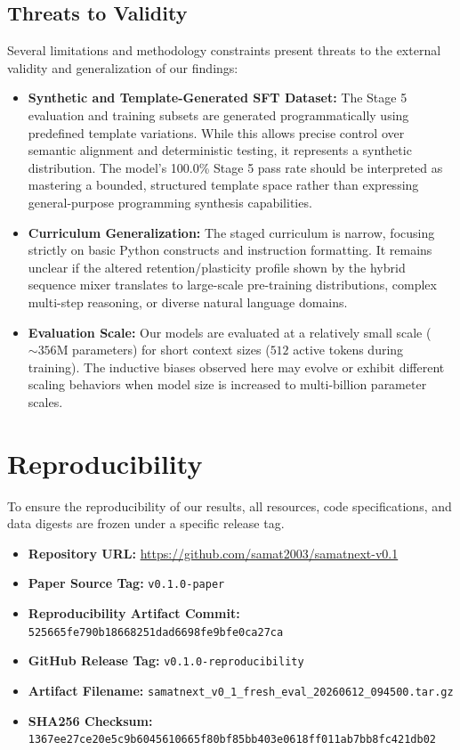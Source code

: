 \documentclass[11pt,a4paper]{article}
\begin{document}
\subsection{Threats to Validity}
Several limitations and methodology constraints present threats to the external validity and generalization of our findings:
\begin{itemize}
    \item \textbf{Synthetic and Template-Generated SFT Dataset:} The Stage 5 evaluation and training subsets are generated programmatically using predefined template variations. While this allows precise control over semantic alignment and deterministic testing, it represents a synthetic distribution. The model's 100.0\% Stage 5 pass rate should be interpreted as mastering a bounded, structured template space rather than expressing general-purpose programming synthesis capabilities.
    \item \textbf{Curriculum Generalization:} The staged curriculum is narrow, focusing strictly on basic Python constructs and instruction formatting. It remains unclear if the altered retention/plasticity profile shown by the hybrid sequence mixer translates to large-scale pre-training distributions, complex multi-step reasoning, or diverse natural language domains.
    \item \textbf{Evaluation Scale:} Our models are evaluated at a relatively small scale ($\sim 356$M parameters) for short context sizes ($512$ active tokens during training). The inductive biases observed here may evolve or exhibit different scaling behaviors when model size is increased to multi-billion parameter scales.
\end{itemize}

\section{Reproducibility}
To ensure the reproducibility of our results, all resources, code specifications, and data digests are frozen under a specific release tag.
\begin{itemize}
    \item \textbf{Repository URL:} \url{https://github.com/samat2003/samatnext-v0.1}
    \item \textbf{Paper Source Tag:} \texttt{v0.1.0-paper}
    \item \textbf{Reproducibility Artifact Commit:}\\
    \texttt{\footnotesize 525665fe790b18668251dad6698fe9bfe0ca27ca}
    \item \textbf{GitHub Release Tag:} \texttt{v0.1.0-reproducibility}
    \item \textbf{Artifact Filename:} \texttt{samatnext\_v0\_1\_fresh\_eval\_20260612\_094500.tar.gz}
    \item \textbf{SHA256 Checksum:}\\
    \texttt{\footnotesize 1367ee27ce20e5c9b6045610665f80bf85bb403e0618ff011ab7bb8fc421db02}
\end{itemize}
\end{document}
